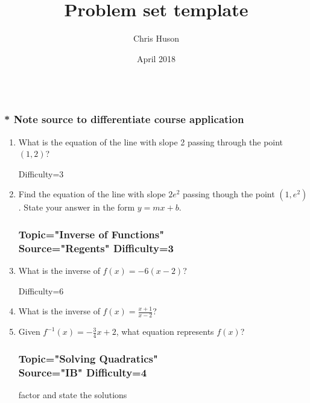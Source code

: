 \documentclass[12pt, oneside]{article}
\title{Problem set template}
\author{Chris Huson}
\date{April 2018}
\begin{document}

\subsubsection*{\\* \textnormal{Note source to differentiate course application}}

\begin{enumerate}

\vspace{0.5 cm}


\subsubsection*{Topic="Writing Linear Equations"\\
Source="cjh" 
Difficulty=2}

\item What is the equation of the line with slope 2 passing through the point $(1, 2)$?

Difficulty=3
\item Find the equation of the line with slope $2e^2$ passing though the point $(1, e^2)$. State your answer in the form $y=mx+b$.

\subsubsection*{Topic="Inverse of Functions"\\
Source="Regents" 
Difficulty=3}

\item What is the inverse of $f(x)=-6(x-2)$? %

Difficulty=6
\item What is the inverse of $\displaystyle f(x)=\frac{x+1}{x-2}$? %

\item Given $f^{-1}(x)=-\frac{3}{4}x+2$, what equation represents $f(x)$? %

\subsubsection*{Topic="Solving Quadratics"\\
Source="IB" 
Difficulty=4}
factor and state the solutions


\end{enumerate}
\end{document}
